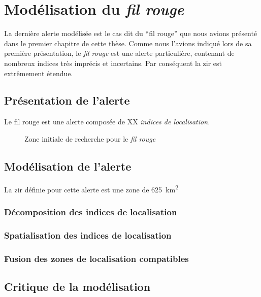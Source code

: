 \section{Modélisation du \emph{fil rouge}}
\label{sec:9-3}

La dernière alerte modélisée est le cas dit du \enquote{fil rouge} que
nous avions présenté dans le premier chapitre de cette thèse. Comme
nous l'avions indiqué lors de sa première présentation, le \emph{fil
  rouge} est une alerte particulière, contenant de nombreux indices
très imprécis et incertains. Par conséquent la \ac{zir} est
extrêmement étendue.


\subsection{Présentation de l'alerte}
\label{subsec:9-3-1}

Le fil rouge est une alerte composée de XX \emph{indices de
  localisation.}

\begin{figure}
  \centering
  
  \caption{Zone initiale de recherche pour le \emph{fil rouge}}
  \label{fig:zir_fil_rouge}
\end{figure}

\subsection{Modélisation de l'alerte}
\label{subsec:9-3-2}

La \ac{zir} définie pour cette alerte est une zone de
\SI{625}{\kilo\meter\squared}

\subsubsection{Décomposition des indices de localisation}
\label{subsec:9-3-2-1}

\subsubsection{Spatialisation des indices de localisation}
\label{subsec:9-3-2-2}

\subsubsection{Fusion des zones de localisation compatibles}
\label{subsec:9-3-2-3}

\subsection{Critique de la modélisation}
\label{subsec:9-3-3}



